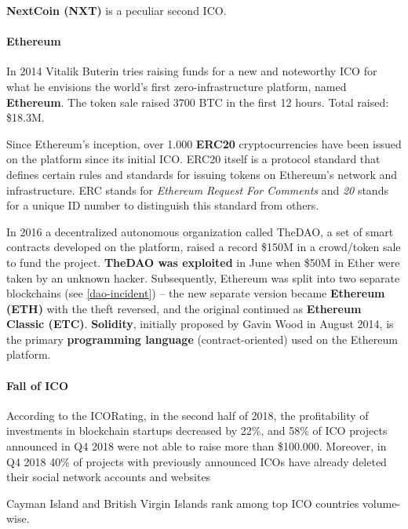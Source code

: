 \textbf{NextCoin (NXT)} is a peculiar second ICO.

\paragraph{Ethereum}
In 2014 Vitalik Buterin tries raising funds for a new and noteworthy ICO for what he envisions the world's first zero-infrastructure platform, named \textbf{Ethereum}.
The token sale raised 3700 BTC in the first 12 hours.
Total raised: \$18.3M.

Since Ethereum's inception, over 1.000 \textbf{ERC20} cryptocurrencies have been issued on the platform since its initial ICO. ERC20 itself is a protocol standard that defines certain rules and standards for issuing tokens on Ethereum's network and infrastructure. ERC stands for \emph{Ethereum Request For Comments} and \emph{20} stands for a unique ID number to distinguish this standard from others.

In 2016 a decentralized autonomous organization called TheDAO, a set of smart contracts developed on the platform, raised a record \$150M in a crowd/token sale to fund the project. \textbf{TheDAO was exploited} in June when \$50M in Ether were taken by an unknown hacker. Subsequently, Ethereum was split into two separate blockchains (see \ref{dao-incident}) -- the new separate version became \textbf{Ethereum (ETH)} with the theft reversed, and the original continued as \textbf{Ethereum Classic (ETC)}.
\textbf{Solidity}, initially proposed by Gavin Wood in August 2014, is the primary \textbf{programming language} (contract-oriented) used on the Ethereum platform.

\paragraph{Fall of ICO}
According to the ICORating, in the second half of 2018, the profitability of investments in blockchain startups decreased by 22\%, and 58\% of ICO projects announced in Q4 2018 were not able to raise more than \$100.000. Moreover, in Q4 2018 40\% of projects with previously announced ICOs have already deleted their social network accounts and websites

Cayman Island and British Virgin Islands rank among top ICO countries volume-wise.

